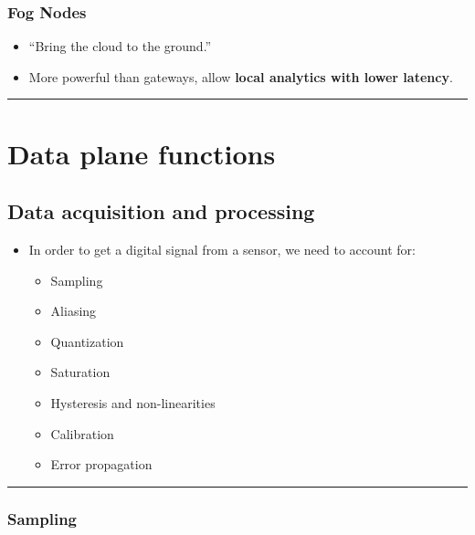 \documentclass[
]{article}
\providecommand{\tightlist}{%
  \setlength{\itemsep}{0pt}\setlength{\parskip}{0pt}}
\begin{document}
\subsubsection{Fog Nodes}\label{fog-nodes}

\begin{itemize}
\tightlist
\item
  ``Bring the cloud to the ground.''
\item
  More powerful than gateways, allow \textbf{local analytics with lower
  latency}.
\end{itemize}

\begin{center}\rule{0.5\linewidth}{0.5pt}\end{center}

\section{Data plane functions}\label{data-plane-functions}

\subsection{Data acquisition and
processing}\label{data-acquisition-and-processing}

\begin{itemize}
\tightlist
\item
  In order to get a digital signal from a sensor, we need to account
  for:

  \begin{itemize}
  \tightlist
  \item
    Sampling
  \item
    Aliasing
  \item
    Quantization
  \item
    Saturation
  \item
    Hysteresis and non-linearities
  \item
    Calibration
  \item
    Error propagation
  \end{itemize}
\end{itemize}

\begin{center}\rule{0.5\linewidth}{0.5pt}\end{center}

\subsubsection{Sampling}\label{sampling}
\end{document}
